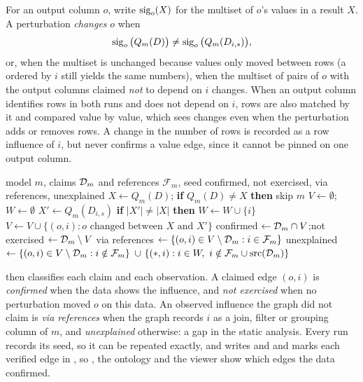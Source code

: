 For an output column $o$, write $\operatorname{sig}_o(X)$ for the multiset of $o$'s values in a result $X$. A
perturbation \emph{changes} $o$ when
\begin{equation}
  \operatorname{sig}_o\big(Q_m(D)\big) \neq \operatorname{sig}_o\big(Q_m(D_{i,s})\big),
  \label{eq:changed}
\end{equation}
or, when the multiset is unchanged because values only moved between rows (a 
ordered by $i$ still yields the same numbers), when the multiset of pairs of $o$ with the output
columns claimed \emph{not} to depend on $i$ changes. When an output column identifies rows in both
runs and does not depend on $i$, rows are also matched by it and compared value by value, which
sees changes even when the perturbation adds or removes rows. A change in the number of rows is
recorded as a row influence of $i$, but never confirms a value edge, since it cannot be pinned on
one output column.

\begin{algorithm}[t]
\caption{Verifying one model}
\label{alg:verify}
\begin{algorithmic}[1]
\Require model $m$, claims $\mathcal{D}_m$ and references $\mathcal{F}_m$, seed
\Ensure confirmed, not exercised, via references, unexplained
\State $X \gets Q_m(D)$; \textbf{if} $Q_m(D) \neq X$ \textbf{then} skip $m$
\State $V \gets \emptyset$;\ $W \gets \emptyset$ 
  \State $X' \gets Q_m(D_{i,s})$
  \State \textbf{if} $|X'| \neq |X|$ \textbf{then} $W \gets W \cup \{i\}$
  \State $V \gets V \cup \{(o, i) : o \text{ changed between } X \text{ and } X'\}$
\EndFor
\State confirmed $\gets \mathcal{D}_m \cap V$;\quad not exercised $\gets \mathcal{D}_m \setminus V$
\State via references $\gets \{(o,i) \in V \setminus \mathcal{D}_m : i \in \mathcal{F}_m\}$
\State unexplained $\gets \{(o,i) \in V \setminus \mathcal{D}_m : i \notin \mathcal{F}_m\}$
\Statex \hspace{\algorithmicindent}$\cup\ \{(\ast, i) : i \in W,\ i \notin \mathcal{F}_m \cup \mathrm{src}(\mathcal{D}_m)\}$
\end{algorithmic}
\end{algorithm}

 then classifies each claim and each observation. A claimed edge $(o, i)$ is
\emph{confirmed} when the data shows the influence, and \emph{not exercised} when no perturbation
moved $o$ on this data. An observed influence the graph did not claim is \emph{via references}
when the graph records $i$ as a join, filter or grouping column of $m$, and \emph{unexplained}
otherwise: a gap in the static analysis. Every run records its seed, so it can be repeated
exactly, and  writes  and  and marks each verified
edge in , so , the ontology and the viewer show which edges the data
confirmed.


